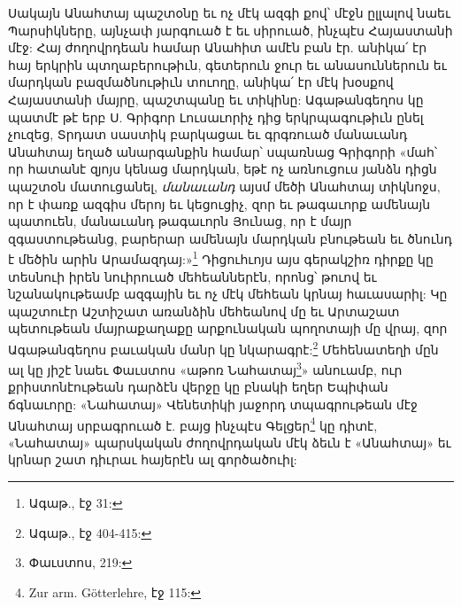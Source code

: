 \documentclass{article}
\begin{document}
{Սակայն Անահտայ պաշտօնը եւ ոչ մէկ ազգի քով՝ մէջն ըլլալով նաեւ Պարսիկները, այնչափ յարգուած է եւ սիրուած, ինչպէս Հայաստանի մէջ: Հայ ժողովրդեան համար Անահիտ ամէն բան էր. անիկա՛ էր հայ երկրին պտղաբերութիւն, գետերուն ջուր եւ անասուններուն եւ մարդկան բազմածնութիւն տուողը, անիկա՛ էր մէկ խօսքով Հայաստանի մայրը, պաշտպանը եւ տիկինը: Ագաթանգեղոս կը պատմէ թէ երբ Ս. Գրիգոր Լուսաւորիչ դից երկրպագութիւն ընել չուզեց, Տրդատ սաստիկ բարկացաւ եւ գրգռուած մանաւանդ Անահտայ եղած անարգանքին համար՝ սպառնաց Գրիգորի «մահ՝ որ հատանէ զյոյս կենաց մարդկան, եթէ ոչ առնուցուս յանձն դիցն պաշտօն մատուցանել, \emph{մանաւանդ} այսմ մեծի Անահտայ տիկնոջս, որ է փառք ազգիս մերոյ եւ կեցուցիչ, զոր եւ թագաւորք ամենայն պատուեն, մանաւանդ թագաւորն Յունաց, որ է մայր զգաստութեանց, բարերար ամենայն մարդկան բնութեան եւ ծնունդ է մեծին արին Արամազդայ:»\footnote{Ագաթ., էջ 31:} Դիցուհւոյս այս գերակշիռ դիրքը կը տեսնուի իրեն նուիրուած մեհեաններէն, որոնց՝ թուով եւ նշանակութեամբ ազգային եւ ոչ մէկ մեհեան կրնայ հաւասարիլ: Կը պաշտուէր Աշտիշատ առանձին մեհեանով մը եւ Արտաշատ պետութեան մայրաքաղաքը արքունական պողոտայի մը վրայ, զոր Ագաթանգեղոս բաւական մանր կը նկարագրէ:\footnote{Ագաթ., էջ 404-415:} Մեհենատեղի մըն ալ կը յիշէ նաեւ Փաւստոս «աթոռ Նահատայ\footnote{Փաւստոս, 219:}» անուամբ, ուր քրիստոնէութեան դարձէն վերջը կը բնակի եղեր Եպիփան ճգնաւորը: «Նահատայ» Վենետիկի յաջորդ տպագրութեան մէջ Անահտայ սրբագրուած է. բայց ինչպէս Գելցեր\footnote{Zur arm. Götterlehre, էջ 115:} կը դիտէ, «Նահատայ» պարսկական ժողովրդական մէկ ձեւն է «Անահտայ» եւ կրնար շատ դիւրաւ հայերէն ալ գործածուիլ:

}
\end{document}
